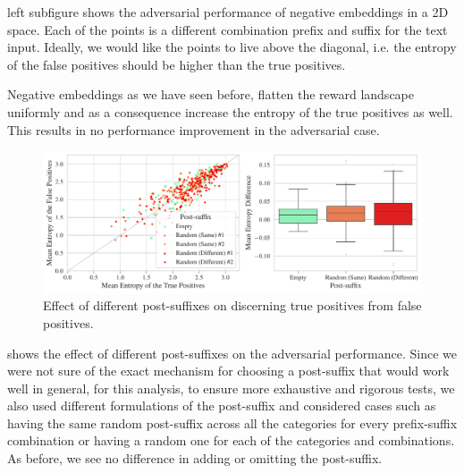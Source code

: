  left subfigure shows the adversarial performance of negative embeddings in a 2D space.
Each of the points is a different combination prefix and suffix for the text input.
Ideally, we would like the points to live above the diagonal, i.e. the entropy of the false positives should be higher than the true positives.

Negative embeddings as we have seen before, flatten the reward landscape uniformly and as a consequence increase the entropy of the true positives as well.
This results in no performance improvement in the adversarial case.

\begin{figure}[h]
    \centering
    \includegraphics[width=\textwidth]{images/post-suffix_adversarial_2.pdf}
    \caption{Effect of different post-suffixes on discerning true positives from false positives.}
    \label{fig:post-suffix-adversarial}
\end{figure}

 shows the effect of different post-suffixes on the adversarial performance.
Since we were not sure of the exact mechanism for choosing a post-suffix that would work well in general, for this analysis, to ensure more exhaustive and rigorous tests, we also used different formulations of the post-suffix and considered cases such as having the same random post-suffix across all the categories for every prefix-suffix combination or having a random one for each of the categories and combinations.
As before, we see no difference in adding or omitting the post-suffix.



